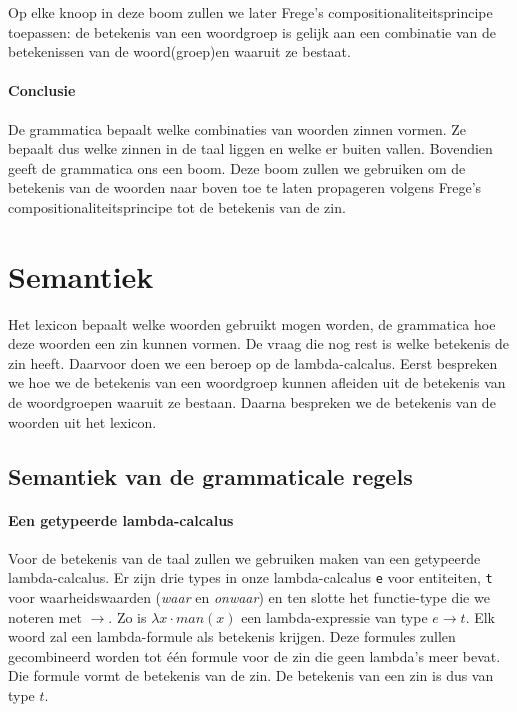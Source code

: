 Op elke knoop in deze boom zullen we later Frege's compositionaliteitsprincipe toepassen: de betekenis van een woordgroep is gelijk aan een combinatie van de betekenissen van de woord(groep)en waaruit ze bestaat.

\paragraph{Conclusie} De grammatica bepaalt welke combinaties van woorden zinnen vormen. Ze bepaalt dus welke zinnen in de taal liggen en welke er buiten vallen. Bovendien geeft de grammatica ons een boom. Deze boom zullen we gebruiken om de betekenis van de woorden naar boven toe te laten propageren volgens Frege's compositionaliteitsprincipe tot de betekenis van de zin.

\section{Semantiek}
Het lexicon bepaalt welke woorden gebruikt mogen worden, de grammatica hoe deze woorden een zin kunnen vormen. De vraag die nog rest is welke betekenis de zin heeft. Daarvoor doen we een beroep op de lambda-calcalus. Eerst bespreken we hoe we de betekenis van een woordgroep kunnen afleiden uit de betekenis van de woordgroepen waaruit ze bestaan. Daarna bespreken we de betekenis van de woorden uit het lexicon.

\subsection{Semantiek van de grammaticale regels}
\paragraph{Een getypeerde lambda-calcalus}
Voor de betekenis van de taal zullen we gebruiken maken van een getypeerde lambda-calcalus. Er zijn drie types in onze lambda-calcalus \texttt{e} voor entiteiten, \texttt{t} voor waarheidswaarden (\textit{waar} en \textit{onwaar}) en ten slotte het functie-type die we noteren met $\rightarrow$. Zo is $\lambda x \cdot man(x)$ een lambda-expressie van type $e \rightarrow t$. Elk woord zal een lambda-formule als betekenis krijgen. Deze formules zullen gecombineerd worden tot één formule voor de zin die geen lambda's meer bevat. Die formule vormt de betekenis van de zin. De betekenis van een zin is dus van type $t$.

